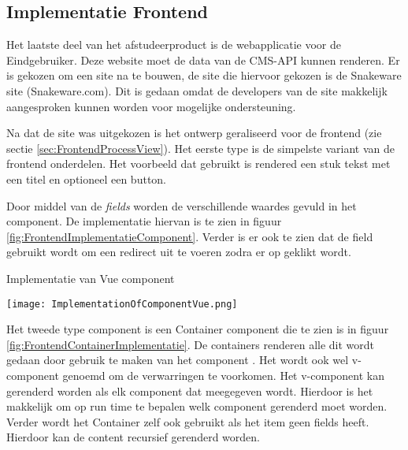 \subsection{Implementatie Frontend}
Het laatste deel van het afstudeerproduct is de webapplicatie voor de \gls{Eindgebruiker}.
Deze website moet de data van de CMS-API kunnen renderen.
Er is gekozen om een site na te bouwen, de site die hiervoor gekozen is de Snakeware site (Snakeware.com).
Dit is gedaan omdat de developers van de site makkelijk aangesproken kunnen worden voor mogelijke ondersteuning.

\whitespace
Na dat de site was uitgekozen is het ontwerp geraliseerd voor de frontend (zie sectie \ref{sec:FrontendProcessView}).
Het eerste type is de simpelste variant van de frontend onderdelen. 
Het voorbeeld dat gebruikt is rendered een stuk tekst met een titel en optioneel een button.

\whitespace
Door middel van de \textit{fields} worden de verschillende waardes gevuld in het component.
%
De implementatie hiervan is te zien in figuur \ref{fig:FrontendImplementatieComponent}.
Verder is er ook te zien dat de  field gebruikt wordt om  een redirect uit te voeren zodra er op geklikt wordt.

\whitespace
\begin{graphic}
    \captionsetup{type=figure}
    \caption{Implementatie van Vue component}
    \texttt{[image: ImplementationOfComponentVue.png]}
    \label{fig:FrontendImplementatieComponent}
\end{graphic}

\whitespace
Het tweede type component is een Container component die te zien is in figuur \ref{fig:FrontendContainerImplementatie}.
De containers renderen alle  dit wordt gedaan door gebruik te maken van het component .
Het  wordt ook wel v-component genoemd om de verwarringen te voorkomen.
Het v-component kan gerenderd worden als elk component dat meegegeven wordt.
Hierdoor is het makkelijk om op run time te bepalen welk component gerenderd moet worden.
Verder wordt het Container zelf ook gebruikt als het item geen fields heeft.
Hierdoor kan de content recursief gerenderd worden.

